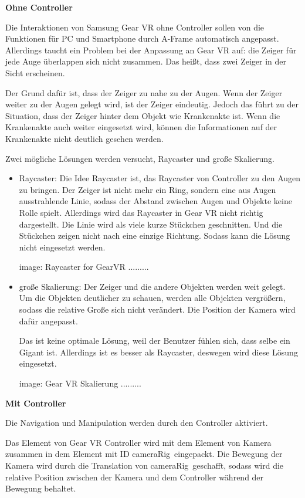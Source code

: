   \textbf{Ohne Controller}
  
  Die Interaktionen von Samsung Gear VR ohne Controller sollen von die Funktionen für PC und Smartphone durch A-Frame automatisch angepasst. Allerdings taucht ein Problem bei der Anpassung an Gear VR auf: die Zeiger für jede Auge überlappen sich nicht zusammen. Das heißt, dass zwei Zeiger in der Sicht erscheinen.
  
  Der Grund dafür ist, dass der Zeiger zu nahe zu der Augen. Wenn der Zeiger weiter zu der Augen gelegt wird, ist der Zeiger eindeutig. Jedoch das führt zu der Situation, dass der Zeiger hinter dem Objekt wie Krankenakte ist. Wenn die Krankenakte auch weiter eingesetzt wird, können die Informationen auf der Krankenakte nicht deutlich gesehen werden.
  
  Zwei mögliche Lösungen werden versucht, Raycaster und große Skalierung.
  \begin{itemize}
      \item Raycaster: Die Idee Raycaster ist, das Raycaster von Controller zu den Augen zu bringen. Der Zeiger ist nicht mehr ein Ring, sondern eine aus Augen ausstrahlende Linie, sodass der Abstand zwischen Augen und Objekte keine Rolle spielt. Allerdings wird das Raycaster in Gear VR nicht richtig dargestellt. Die Linie wird als viele kurze Stückchen geschnitten. Und die Stückchen zeigen nicht nach eine einzige Richtung. Sodass kann die Lösung nicht eingesetzt werden.
      
      image: Raycaster for GearVR .........
      
      \item große Skalierung: Der Zeiger und die andere Objekten werden weit gelegt. Um die Objekten deutlicher zu schauen, werden alle Objekten vergrößern, sodass die relative Große sich nicht verändert. Die Position der Kamera wird dafür angepasst.
      
      Das ist keine optimale Lösung, weil der Benutzer fühlen sich, dass selbe ein Gigant ist. Allerdings ist es besser als Raycaster, deswegen wird diese Lösung eingesetzt.
      
      image: Gear VR Skalierung .........
      
  \end{itemize}
  
  \textbf{Mit Controller}
  
  Die Navigation und Manipulation werden durch den Controller aktiviert.
  
  Das Element von Gear VR Controller wird mit dem Element von Kamera zusammen in dem Element mit ID \glqq cameraRig\grqq\ eingepackt. Die Bewegung der Kamera wird durch die Translation von \glqq cameraRig\grqq\ geschafft, sodass wird die relative Position zwischen der Kamera und dem Controller während der Bewegung behaltet.
  
